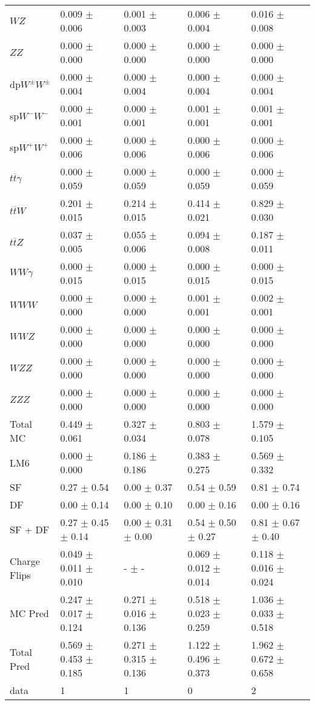 \begin{tabular}{l | l l l l}
$WZ$ &  0.009 $\pm$  0.006 &  0.001 $\pm$  0.003 &  0.006 $\pm$  0.004 &  0.016 $\pm$  0.008\\
$ZZ$ &  0.000 $\pm$   0.000 &  0.000 $\pm$   0.000 &   0.000 $\pm$   0.000 &   0.000 $\pm$   0.000\\
\hline
dp$W^{\pm}W^{\pm}$ &  0.000 $\pm$  0.004 &  0.000 $\pm$  0.004 &  0.000 $\pm$  0.004 &  0.000 $\pm$  0.004\\
sp$W^{-}W^{-}$ &  0.000 $\pm$  0.001 &  0.000 $\pm$  0.001 &  0.001 $\pm$  0.001 &  0.001 $\pm$  0.001\\
sp$W^{+}W^{+}$ &  0.000 $\pm$  0.006 &  0.000 $\pm$  0.006 &  0.000 $\pm$  0.006 &  0.000 $\pm$  0.006\\
$t\overline{t}\gamma$ &  0.000 $\pm$  0.059 &  0.000 $\pm$  0.059 &  0.000 $\pm$  0.059 &  0.000 $\pm$  0.059\\
$t\overline{t}W$ &  0.201 $\pm$  0.015 &  0.214 $\pm$  0.015 &  0.414 $\pm$  0.021 &  0.829 $\pm$  0.030\\
$t\overline{t}Z$ &  0.037 $\pm$  0.005 &  0.055 $\pm$  0.006 &  0.094 $\pm$  0.008 &  0.187 $\pm$  0.011\\
$WW\gamma$ &  0.000 $\pm$  0.015 &  0.000 $\pm$  0.015 &  0.000 $\pm$  0.015 &  0.000 $\pm$  0.015\\
$WWW$ &   0.000 $\pm$   0.000 &   0.000 $\pm$   0.000 &  0.001 $\pm$  0.001 &  0.002 $\pm$  0.001\\
$WWZ$ &  0.000 $\pm$   0.000 &  0.000 $\pm$   0.000 &  0.000 $\pm$   0.000 &  0.000 $\pm$   0.000\\
$WZZ$ &   0.000 $\pm$   0.000 &  0.000 $\pm$   0.000 &   0.000 $\pm$   0.000 &   0.000 $\pm$   0.000\\
$ZZZ$ &  0.000 $\pm$   0.000 &   0.000 $\pm$   0.000 &   0.000 $\pm$   0.000 &   0.000 $\pm$   0.000\\
\hline
Total MC &  0.449 $\pm$  0.061 &  0.327 $\pm$  0.034 &  0.803 $\pm$  0.078 &  1.579 $\pm$  0.105\\
\hline\hline
\hline
LM6 &  0.000 $\pm$  0.000 &  0.186 $\pm$  0.186 &  0.383 $\pm$  0.275 &  0.569 $\pm$  0.332\\
\hline\hline
\hline\hline
 SF  & 0.27 $\pm$ 0.54 & 0.00 $\pm$ 0.37 & 0.54 $\pm$ 0.59 & 0.81 $\pm$ 0.74\\
 DF  & 0.00 $\pm$ 0.14 & 0.00 $\pm$ 0.10 & 0.00 $\pm$ 0.16 & 0.00 $\pm$ 0.16\\
\hline
 SF + DF  & 0.27 $\pm$ 0.45 $\pm$ 0.14 & 0.00 $\pm$ 0.31 $\pm$ 0.00 & 0.54 $\pm$ 0.50 $\pm$ 0.27 & 0.81 $\pm$ 0.67 $\pm$ 0.40\\
\hline\hline
Charge Flips & 0.049 $\pm$ 0.011 $\pm$ 0.010 & - $\pm$ - & 0.069 $\pm$ 0.012 $\pm$ 0.014 & 0.118 $\pm$ 0.016 $\pm$ 0.024\\
\hline\hline
\hline
MC Pred &  0.247 $\pm$  0.017 $\pm$  0.124 &  0.271 $\pm$  0.016 $\pm$  0.136 &  0.518 $\pm$  0.023 $\pm$  0.259 &  1.036 $\pm$  0.033 $\pm$  0.518\\
\hline\hline
Total Pred &  0.569 $\pm$  0.453 $\pm$  0.185 &  0.271 $\pm$  0.315 $\pm$  0.136 &  1.122 $\pm$  0.496 $\pm$  0.373 &  1.962 $\pm$  0.672 $\pm$  0.658\\
\hline\hline
data & 1 & 1 & 0 & 2\\
\hline\hline
\end{tabular}

